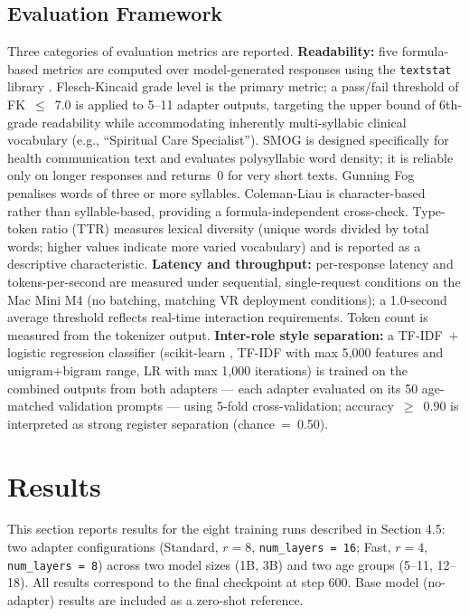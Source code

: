 \documentclass[journal]{IEEEtai}
\begin{document}
\subsection{Evaluation Framework}

Three categories of evaluation metrics are reported. \textbf{Readability:} five formula-based metrics are computed over model-generated responses using the \texttt{textstat} library \cite{bansal2023textstat}. Flesch-Kincaid grade level \cite{kincaid1975fk} is the primary metric; a pass/fail threshold of FK~$\leq$~7.0 is applied to 5--11 adapter outputs, targeting the upper bound of 6th-grade readability while accommodating inherently multi-syllabic clinical vocabulary (e.g., ``Spiritual Care Specialist''). SMOG \cite{mclaughlin1969smog} is designed specifically for health communication text and evaluates polysyllabic word density; it is reliable only on longer responses and returns~0 for very short texts. Gunning Fog \cite{gunning1952fog} penalises words of three or more syllables. Coleman-Liau \cite{coleman1975cli} is character-based rather than syllable-based, providing a formula-independent cross-check. Type-token ratio (TTR) measures lexical diversity (unique words divided by total words; higher values indicate more varied vocabulary) and is reported as a descriptive characteristic. \textbf{Latency and throughput:} per-response latency and tokens-per-second are measured under sequential, single-request conditions on the Mac Mini M4 (no batching, matching VR deployment conditions); a 1.0-second average threshold reflects real-time interaction requirements. Token count is measured from the tokenizer output. \textbf{Inter-role style separation:} a TF-IDF~$+$ logistic regression classifier (scikit-learn \cite{pedregosa2011sklearn}, TF-IDF with max 5{,}000 features and unigram+bigram range, LR with max 1{,}000 iterations) is trained on the combined outputs from both adapters --- each adapter evaluated on its 50 age-matched validation prompts --- using 5-fold cross-validation; accuracy~$\geq$~0.90 is interpreted as strong register separation (chance~=~0.50).

\section{Results}

This section reports results for the eight training runs described in Section 4.5: two adapter configurations (Standard, $r = 8$, \texttt{num\_layers = 16}; Fast, $r = 4$, \texttt{num\_layers = 8}) across two model sizes (1B, 3B) and two age groups (5--11, 12--18). All results correspond to the final checkpoint at step 600. Base model (no-adapter) results are included as a zero-shot reference.
\end{document}
